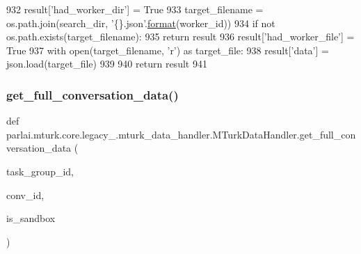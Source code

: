 \begin{DoxyCode}
932         result[\textcolor{stringliteral}{'had\_worker\_dir'}] = \textcolor{keyword}{True}
933         target\_filename = os.path.join(search\_dir, \textcolor{stringliteral}{'\{\}.json'}.\hyperlink{namespaceparlai_1_1chat__service_1_1services_1_1messenger_1_1shared__utils_a32e2e2022b824fbaf80c747160b52a76}{format}(worker\_id))
934         \textcolor{keywordflow}{if} \textcolor{keywordflow}{not} os.path.exists(target\_filename):
935             \textcolor{keywordflow}{return} result
936         result[\textcolor{stringliteral}{'had\_worker\_file'}] = \textcolor{keyword}{True}
937         with open(target\_filename, \textcolor{stringliteral}{'r') as target\_file:}
938 \textcolor{stringliteral}{            result['data'}] = json.load(target\_file)
939 
940         \textcolor{keywordflow}{return} result
941 
\end{DoxyCode}
\mbox{\label{classparlai_1_1mturk_1_1core_1_1legacy__2018_1_1mturk__data__handler_1_1MTurkDataHandler_a525c02fdb0cfb16a780b0aa8ac787a57}} 
\subsubsection{\texorpdfstring{get\+\_\+full\+\_\+conversation\+\_\+data()}{get\_full\_conversation\_data()}}
{\footnotesize\ttfamily def parlai.\+mturk.\+core.\+legacy\+\_.\+mturk\+\_\+data\+\_\+handler.\+M\+Turk\+Data\+Handler.\+get\+\_\+full\+\_\+conversation\+\_\+data (\begin{DoxyParamCaption}\item[{}]{task\+\_\+group\+\_\+id,  }\item[{}]{conv\+\_\+id,  }\item[{}]{is\+\_\+sandbox }\end{DoxyParamCaption})\hspace{0.3cm}{\ttfamily [static]}}

